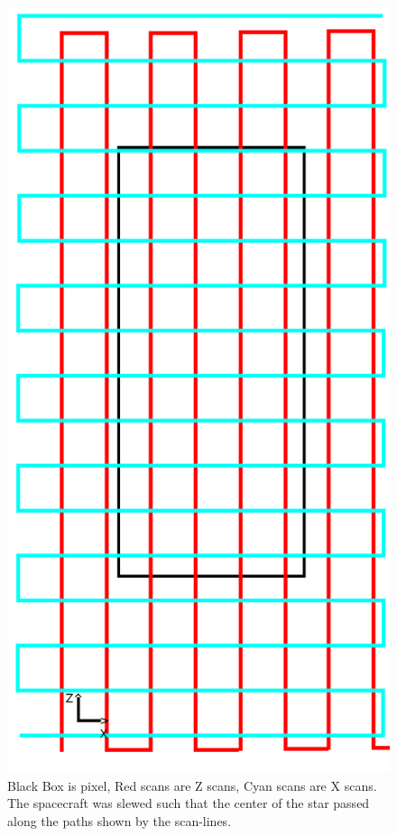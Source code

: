 \documentclass[12pt]{article}
\begin{document}
\begin{figure}[h!]
\centering
\includegraphics[scale=0.3]{figs/ScanLines.png}
\caption{
Black Box is pixel, Red scans are Z scans, Cyan scans are X scans.
The spacecraft was slewed such that the center of the star passed along the
paths shown by the scan-lines.
}
\label{fig:scans}
\end{figure}
\end{document}
